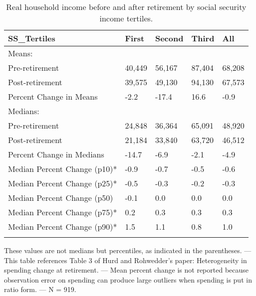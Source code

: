 \begin{table}[tbp] \centering
{}

\caption{Real household income before and after retirement by social security income tertiles.}
\begin{tabularx}{\textwidth}{lCCCC}

\toprule
{SS\_Tertiles}&{First}&{Second}&{Third}&{All} \tabularnewline
\midrule\addlinespace[1.5ex]
Means:&&&& \tabularnewline
\midrule Pre-retirement&40,449&56,167&87,404&68,208 \tabularnewline
Post-retirement&39,575&49,130&94,130&67,573 \tabularnewline
Percent Change in Means&-2.2&-17.4&16.6&-0.9 \tabularnewline
\midrule Medians:&&&& \tabularnewline
\midrule Pre-retirement&24,848&36,364&65,091&48,920 \tabularnewline
Post-retirement&21,184&33,840&63,720&46,512 \tabularnewline
Percent Change in Medians&-14.7&-6.9&-2.1&-4.9 \tabularnewline
Median Percent Change (p10)*&-0.9&-0.7&-0.5&-0.6 \tabularnewline
Median Percent Change (p25)*&-0.5&-0.3&-0.2&-0.3 \tabularnewline
Median Percent Change (p50)&-0.1&0.0&0.0&0.0 \tabularnewline
Median Percent Change (p75)*&0.2&0.3&0.3&0.3 \tabularnewline
Median Percent Change (p90)*&1.5&1.1&0.8&1.0 \tabularnewline
\bottomrule \addlinespace[1.5ex]

\end{tabularx}
\begin{flushleft}
\footnotesize *These values are not medians but percentiles, as indicated in the parentheses. \linebreak --- \linebreak This table references Table 3 of Hurd and Rohwedder's paper: Heterogeneity in spending change at retirement. \linebreak --- \linebreak Mean percent change is not reported because observation error on spending can produce large outliers when spending is put in ratio form. \linebreak --- \linebreak N = 919.
\end{flushleft}
\end{table}
